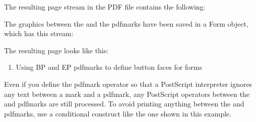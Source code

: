 \documentclass[letterpaper,12pt,english,openany,oneside]{sphinxmanual}
\begin{document}
The resulting page stream in the PDF file contains the following:

\begin{sphinxVerbatim}[commandchars=\\\{\}]
 
        
             
             
             
        
\end{sphinxVerbatim}

The graphics between the  and the  pdfmarks have been saved in a Form object, which has this stream:

\begin{sphinxVerbatim}[commandchars=\\\{\}]
 
     
     
     
     
\end{sphinxVerbatim}

The resulting page looks like this:

\noindent{}
\begin{enumerate}
%
\item {} 
Using BP and EP pdfmarks to define button faces for forms

\end{enumerate}

Even if you define the pdfmark operator so that a PostScript interpreter ignores any text between a mark and a pdfmark, any PostScript operators between the  and  pdfmarks are still processed. To avoid printing anything between the  and  pdfmarks, use a conditional construct like the one shown in this example.
\end{document}
